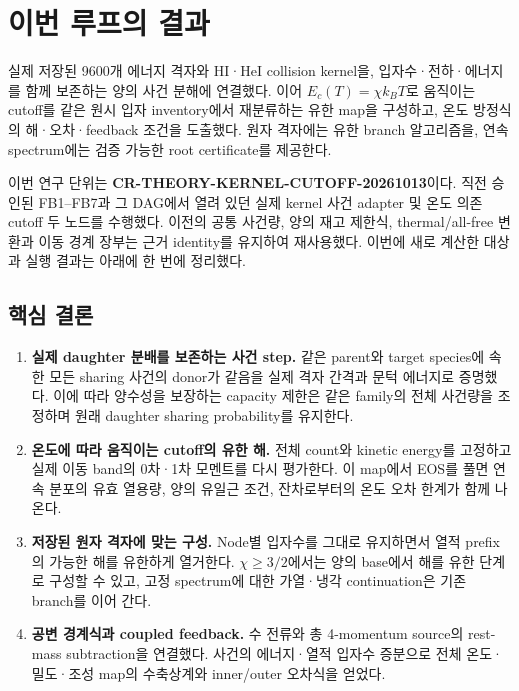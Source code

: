 \hypertarget{uxc774uxbc88-uxb8e8uxd504uxc758-uxacb0uxacfc}{%
\section{이번 루프의 결과}\label{uxc774uxbc88-uxb8e8uxd504uxc758-uxacb0uxacfc}}

실제 저장된 9600개 에너지 격자와 HI·HeI collision kernel을, 입자수·전하·에너지를 함께 보존하는 양의 사건 분해에 연결했다. 이어 \(E_c(T)=\chi k_BT\)로 움직이는 cutoff를 같은 원시 입자 inventory에서 재분류하는 유한 map을 구성하고, 온도 방정식의 해·오차·feedback 조건을 도출했다. 원자 격자에는 유한 branch 알고리즘을, 연속 spectrum에는 검증 가능한 root certificate를 제공한다.

이번 연구 단위는 \textbf{CR-THEORY-KERNEL-CUTOFF-20261013}이다. 직전 승인된 FB1--FB7과 그 DAG에서 열려 있던 실제 kernel 사건 adapter 및 온도 의존 cutoff 두 노드를 수행했다. 이전의 공통 사건량, 양의 재고 제한식, thermal/all-free 변환과 이동 경계 장부는 근거 identity를 유지하여 재사용했다. 이번에 새로 계산한 대상과 실행 결과는 아래에 한 번에 정리했다.

\hypertarget{uxd575uxc2ec-uxacb0uxb860}{%
\subsection{핵심 결론}\label{uxd575uxc2ec-uxacb0uxb860}}

\begin{enumerate}
\def\labelenumi{\arabic{enumi}.}
\tightlist
\item
  \textbf{실제 daughter 분배를 보존하는 사건 step.} 같은 parent와 target species에 속한 모든 sharing 사건의 donor가 같음을 실제 격자 간격과 문턱 에너지로 증명했다. 이에 따라 양수성을 보장하는 capacity 제한은 같은 family의 전체 사건량을 조정하며 원래 daughter sharing probability를 유지한다.
\item
  \textbf{온도에 따라 움직이는 cutoff의 유한 해.} 전체 count와 kinetic energy를 고정하고 실제 이동 band의 0차·1차 모멘트를 다시 평가한다. 이 map에서 EOS를 풀면 연속 분포의 유효 열용량, 양의 유일근 조건, 잔차로부터의 온도 오차 한계가 함께 나온다.
\item
  \textbf{저장된 원자 격자에 맞는 구성.} Node별 입자수를 그대로 유지하면서 열적 prefix의 가능한 해를 유한하게 열거한다. \(\chi\ge3/2\)에서는 양의 base에서 해를 유한 단계로 구성할 수 있고, 고정 spectrum에 대한 가열·냉각 continuation은 기존 branch를 이어 간다.
\item
  \textbf{공변 경계식과 coupled feedback.} 수 전류와 총 4-momentum source의 rest-mass subtraction을 연결했다. 사건의 에너지·열적 입자수 증분으로 전체 온도·밀도·조성 map의 수축상계와 inner/outer 오차식을 얻었다.
\end{enumerate}

